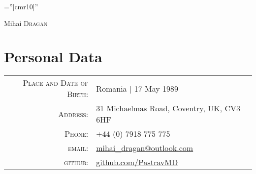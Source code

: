 \documentclass[a4paper,10pt]{article}
\begin{document}
\pagestyle{empty} %

\font\fb=''[cmr10]'' %

\par{\centering
		{\Huge Mihai \textsc{Dragan}
	}\bigskip\par}

\section{Personal Data}

\begin{tabular}{rl}
    \textsc{Place and Date of Birth:} & Romania  | 17 May 1989 \\
    \textsc{Address:}   & 31 Michaelmas Road, Coventry, UK, CV3 6HF \\
    \textsc{Phone:}     & +44 (0) 7918 775 775\\
    \textsc{email:}     & \href{mailto:mihai_dragan@outlook.com}{mihai\_dragan@outlook.com}\\
    \textsc{github:}    & \href{https://github.com/PastravMD}{github.com/PastravMD}
\end{tabular}

\end{document}
